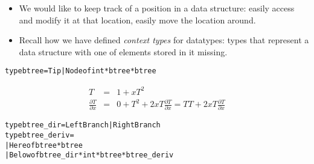 \documentclass{beamer}
\newcommand{\tmem}[1]{{\em #1\/}}
\newenvironment{tmcode}[1][]{\begin{alltt} }{\end{alltt}}
\begin{document}
\begin{itemize}
  \item We would like to keep track of a position in a data structure: easily
  access and modify it at that location, easily move the location around.
  
  \item Recall how we have defined {\tmem{context types}} for datatypes: types
  that represent a data structure with one of elements stored in it missing.
\end{itemize}
\begin{tmcode}
type btree = Tip | Node of int * btree * btree
\end{tmcode}
\begin{eqnarray*}
  T & = & 1 + xT^2\\
  \frac{\partial T}{\partial x} & = & 0 + T^2 + 2 xT \frac{\partial
  T}{\partial x} = TT + 2 xT \frac{\partial T}{\partial x}
\end{eqnarray*}
\begin{tmcode}
type btree_dir = LeftBranch | RightBranch
type btree_deriv =
  | Here of btree * btree
  | Below of btree_dir * int * btree * btree_deriv
\end{tmcode}
\end{document}
